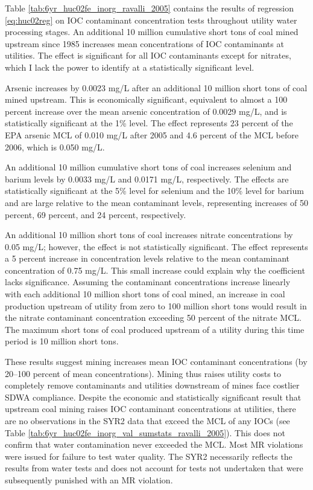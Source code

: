 \documentclass[12pt]{article}
\begin{document}


Table \ref{tab:6yr_huc02fe_inorg_ravalli_2005} contains the results of regression \ref{eq:huc02reg} on IOC contaminant concentration tests throughout utility water processing stages. An additional 10 million cumulative short tons of coal mined upstream since 1985 increases mean concentrations of IOC contaminants at utilities. The effect is significant for all IOC contaminants except for nitrates, which I lack the power to identify at a statistically significant level.

Arsenic increases by 0.0023 mg/L after an additional 10 million short tons of coal mined upstream. This is economically significant, equivalent to almost a 100 percent increase over the mean arsenic concentration of 0.0029 mg/L, and is statistically significant at the 1\% level. The effect represents 23 percent of the EPA arsenic MCL of 0.010 mg/L after 2005 and 4.6 percent of the MCL before 2006, which is 0.050 mg/L.

An additional 10 million cumulative short tons of coal increases selenium and barium levels by 0.0033 mg/L and 0.0171 mg/L, respectively. The effects are statistically significant at the 5\% level for selenium and the 10\% level for barium and are large relative to the mean contaminant levels, representing increases of 50 percent, 69 percent, and 24 percent, respectively.

An additional 10 million short tons of coal increases nitrate concentrations by 0.05 mg/L; however, the effect is not statistically significant. The effect represents a 5 percent increase in concentration levels relative to the mean contaminant concentration of 0.75 mg/L. This small increase could explain why the coefficient lacks significance. Assuming the contaminant concentrations increase linearly with each additional 10 million short tons of coal mined, an increase in coal production upstream of utility from zero to 100 million short tons would result in the nitrate contaminant concentration exceeding 50 percent of the nitrate MCL. The maximum short tons of coal produced upstream of a utility during this time period is 10 million short tons. 

These results suggest mining increases mean IOC contaminant concentrations (by 20--100 percent
of mean concentrations). Mining thus raises utility costs to completely remove contaminants and utilities downstream of mines face costlier SDWA compliance. Despite the economic and statistically significant result that upstream coal mining raises IOC contaminant concentrations at utilities, there are no observations in the SYR2 data that exceed the MCL of any IOCs (see Table \ref{tab:6yr_huc02fe_inorg_val_sumstats_ravalli_2005}). This does not confirm that water contamination never exceeded the MCL. Most MR violations were issued for failure to test water quality. The SYR2 necessarily reflects the results from water tests and does not account for tests not undertaken that were subsequently punished with an MR violation.
\end{document}
